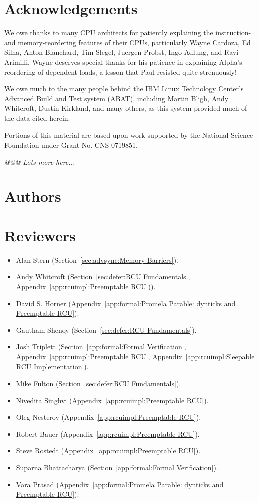 
\section*{Acknowledgements}

We owe thanks to many CPU architects for patiently explaining the
instruction- and memory-reordering features of their CPUs, particularly
Wayne Cardoza, Ed Silha, Anton Blanchard, Tim Slegel, Juergen Probst,
Ingo Adlung, and Ravi Arimilli.
Wayne deserves special thanks for his patience in explaining Alpha's reordering
of dependent loads, a lesson that Paul resisted quite strenuously!

We owe much to the many people behind the IBM Linux Technology Center's
Advanced Build and Test system (ABAT), including Martin Bligh, Andy
Whitcroft, Dustin Kirkland, and many others, as this system provided much
of the data cited herein.

Portions of this material are based upon work supported by the National
Science Foundation under Grant No. CNS-0719851.

\emph{@@@ Lots more here...}

\section*{Authors}

\section*{Reviewers}

\begin{itemize}
\item	Alan Stern (Section~\ref{sec:advsync:Memory Barriers}).
\item	Andy Whitcroft (Section~\ref{sec:defer:RCU Fundamentals},
	Appendix~\ref{app:rcuimpl:Preemptable RCU})).
\item	David S. Horner
	(Appendix~\ref{app:formal:Promela Parable: dynticks and Preemptable RCU}).
\item	Gautham Shenoy (Section~\ref{sec:defer:RCU Fundamentals}).
\item	Josh Triplett
	(Section~\ref{app:formal:Formal Verification},
	Appendix~\ref{app:rcuimpl:Preemptable RCU},
	Appendix~\ref{app:rcuimpl:Sleepable RCU Implementation}).
\item	Mike Fulton (Section~\ref{sec:defer:RCU Fundamentals}).
\item	Nivedita Singhvi (Appendix~\ref{app:rcuimpl:Preemptable RCU}).
\item	Oleg Nesterov (Appendix~\ref{app:rcuimpl:Preemptable RCU}).
\item	Robert Bauer (Appendix~\ref{app:rcuimpl:Preemptable RCU}).
\item	Steve Rostedt (Appendix~\ref{app:rcuimpl:Preemptable RCU}).
\item	Suparna Bhattacharya
	(Section~\ref{app:formal:Formal Verification}).
\item	Vara Prasad
	(Appendix~\ref{app:formal:Promela Parable: dynticks and Preemptable RCU}).
\end{itemize}


